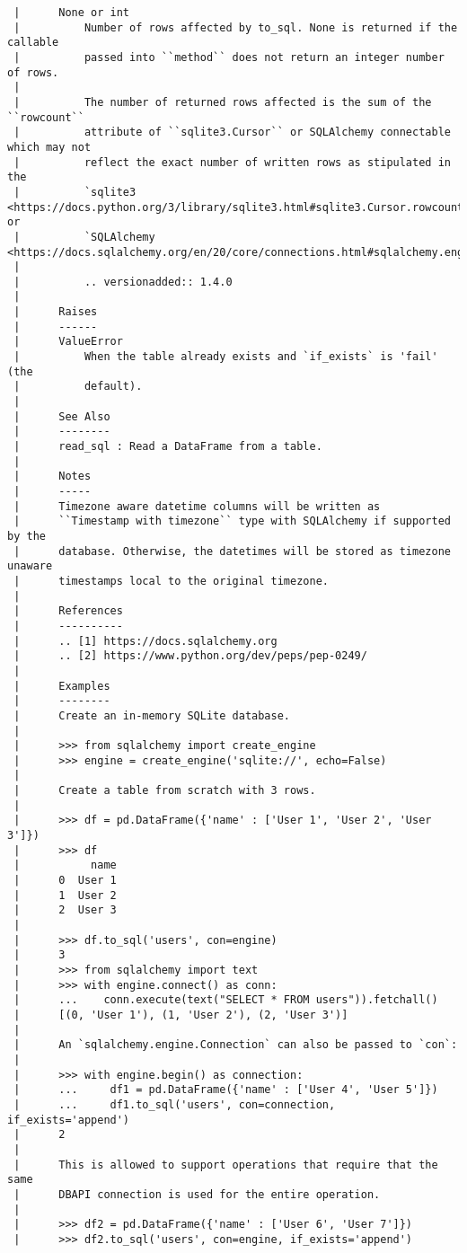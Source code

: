 \documentclass[
  letterpaper,
  DIV=11,
  numbers=noendperiod]{scrreprt}
\begin{document}
\begin{verbatim}
 |      None or int
 |          Number of rows affected by to_sql. None is returned if the callable
 |          passed into ``method`` does not return an integer number of rows.
 |      
 |          The number of returned rows affected is the sum of the ``rowcount``
 |          attribute of ``sqlite3.Cursor`` or SQLAlchemy connectable which may not
 |          reflect the exact number of written rows as stipulated in the
 |          `sqlite3 <https://docs.python.org/3/library/sqlite3.html#sqlite3.Cursor.rowcount>`__ or
 |          `SQLAlchemy <https://docs.sqlalchemy.org/en/20/core/connections.html#sqlalchemy.engine.CursorResult.rowcount>`__.
 |      
 |          .. versionadded:: 1.4.0
 |      
 |      Raises
 |      ------
 |      ValueError
 |          When the table already exists and `if_exists` is 'fail' (the
 |          default).
 |      
 |      See Also
 |      --------
 |      read_sql : Read a DataFrame from a table.
 |      
 |      Notes
 |      -----
 |      Timezone aware datetime columns will be written as
 |      ``Timestamp with timezone`` type with SQLAlchemy if supported by the
 |      database. Otherwise, the datetimes will be stored as timezone unaware
 |      timestamps local to the original timezone.
 |      
 |      References
 |      ----------
 |      .. [1] https://docs.sqlalchemy.org
 |      .. [2] https://www.python.org/dev/peps/pep-0249/
 |      
 |      Examples
 |      --------
 |      Create an in-memory SQLite database.
 |      
 |      >>> from sqlalchemy import create_engine
 |      >>> engine = create_engine('sqlite://', echo=False)
 |      
 |      Create a table from scratch with 3 rows.
 |      
 |      >>> df = pd.DataFrame({'name' : ['User 1', 'User 2', 'User 3']})
 |      >>> df
 |           name
 |      0  User 1
 |      1  User 2
 |      2  User 3
 |      
 |      >>> df.to_sql('users', con=engine)
 |      3
 |      >>> from sqlalchemy import text
 |      >>> with engine.connect() as conn:
 |      ...    conn.execute(text("SELECT * FROM users")).fetchall()
 |      [(0, 'User 1'), (1, 'User 2'), (2, 'User 3')]
 |      
 |      An `sqlalchemy.engine.Connection` can also be passed to `con`:
 |      
 |      >>> with engine.begin() as connection:
 |      ...     df1 = pd.DataFrame({'name' : ['User 4', 'User 5']})
 |      ...     df1.to_sql('users', con=connection, if_exists='append')
 |      2
 |      
 |      This is allowed to support operations that require that the same
 |      DBAPI connection is used for the entire operation.
 |      
 |      >>> df2 = pd.DataFrame({'name' : ['User 6', 'User 7']})
 |      >>> df2.to_sql('users', con=engine, if_exists='append')

\end{verbatim}
\end{document}
